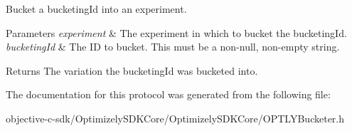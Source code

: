 Bucket a bucketing\+Id into an experiment. 
\begin{DoxyParams}{Parameters}
{\em experiment} & The experiment in which to bucket the bucketing\+Id. \\
\hline
{\em bucketing\+Id} & The ID to bucket. This must be a non-\/null, non-\/empty string. \\
\hline
\end{DoxyParams}
\begin{DoxyReturn}{Returns}
The variation the bucketing\+Id was bucketed into. 
\end{DoxyReturn}


The documentation for this protocol was generated from the following file\+:\begin{DoxyCompactItemize}
\item 
objective-\/c-\/sdk/\+Optimizely\+S\+D\+K\+Core/\+Optimizely\+S\+D\+K\+Core/O\+P\+T\+L\+Y\+Bucketer.\+h\end{DoxyCompactItemize}
